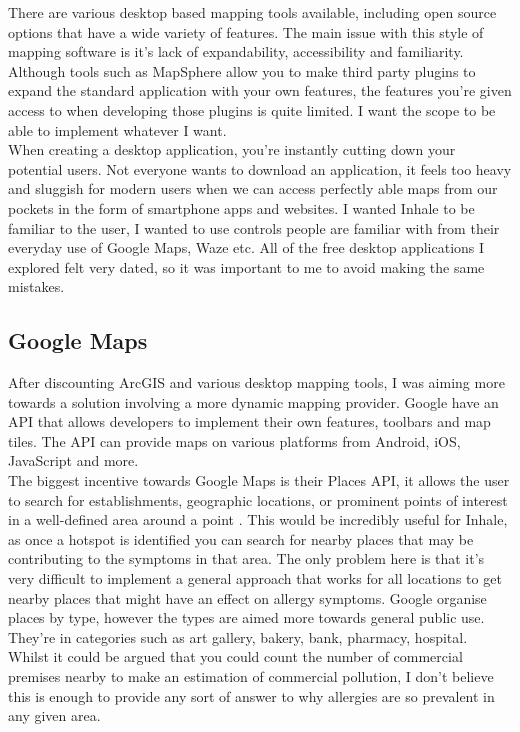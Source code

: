 There are various desktop based mapping tools available, including open source options that have a wide variety of features. The main issue with this style of mapping software is it's lack of expandability, accessibility and familiarity.\\

Although tools such as MapSphere allow you to make third party plugins to expand the standard application with your own features, the features you're given access to when developing those plugins is quite limited. I want the scope to be able to implement whatever I want.\\

When creating a desktop application, you're instantly cutting down your potential users. Not everyone wants to download an application, it feels too heavy and sluggish for modern users when we can access perfectly able maps from our pockets in the form of smartphone apps and websites. I wanted Inhale to be familiar to the user, I wanted to use controls people are familiar with from their everyday use of Google Maps, Waze etc. All of the free desktop applications I explored felt very dated, so it was important to me to avoid making the same mistakes.\\

\subsection{Google Maps}

After discounting ArcGIS and various desktop mapping tools, I was aiming more towards a solution involving a more dynamic mapping provider. Google have an API that allows developers to implement their own features, toolbars and map tiles. The API can provide maps on various platforms from Android, iOS, JavaScript and more.\\

The biggest incentive towards Google Maps is their Places API, it allows the user to search for establishments, geographic locations, or prominent points of interest in a well-defined area around a point \cite{googlePlaces}. This would be incredibly useful for Inhale, as once a hotspot is identified you can search for nearby places that may be contributing to the symptoms in that area. The only problem here is that it's very difficult to implement a general approach that works for all locations to get nearby places that might have an effect on allergy symptoms. Google organise places by type, however the types are aimed more towards general public use. They're in categories such as art gallery, bakery, bank, pharmacy, hospital. Whilst it could be argued that you could count the number of commercial premises nearby to make an estimation of commercial pollution, I don't believe this is enough to provide any sort of answer to why allergies are so prevalent in any given area.\\


